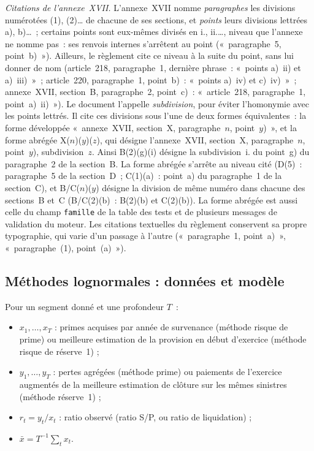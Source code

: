 \documentclass[a4paper,11pt]{article}
\newcommand{\code}[1]{\texttt{\small #1}}
\begin{document}
\smallskip
\emph{Citations de l'annexe~XVII.} L'annexe~XVII nomme \emph{paragraphes} les divisions
numérotées (1), (2)\dots{} de chacune de ses sections, et \emph{points} leurs divisions
lettrées a), b)\dots{}~; certains points sont eux-mêmes divisés en i., ii.\dots{}, niveau que
l'annexe ne nomme pas~: ses renvois internes s'arrêtent au point («~paragraphe~5,
point~b)~»). Ailleurs, le règlement cite ce niveau à la suite du point, sans lui donner de nom
(article~218, paragraphe~1, dernière phrase~: «~points a)~ii) et a)~iii)~»~; article~220,
paragraphe~1, point~b)~: «~points a)~iv) et c)~iv)~»~; annexe~XVII, section~B, paragraphe~2,
point~c)~: «~article~218, paragraphe~1, point~a)~ii)~»). Le document l'appelle
\emph{subdivision}, pour éviter l'homonymie avec les points lettrés. Il
cite ces divisions sous l'une de deux formes équivalentes~: la forme développée
«~annexe~XVII, section~X, paragraphe~$n$, point~$y$)~», et la forme abrégée X($n$)($y$)($z$), qui
désigne l'annexe~XVII, section~X, paragraphe~$n$, point~$y$), subdivision~$z$. Ainsi B(2)(g)(i)
désigne la subdivision~i. du point~g) du paragraphe~2 de la section~B. La forme abrégée s'arrête
au niveau cité (D(5)~: paragraphe~5 de la section~D~; C(1)(a)~: point~a) du paragraphe~1 de la
section~C), et B/C($n$)($y$) désigne la division de même numéro dans chacune des sections~B
et~C (B/C(2)(b)~: B(2)(b) et C(2)(b)). La forme abrégée est aussi celle du champ \code{famille}
de la table des tests et de plusieurs messages de validation du moteur. Les citations textuelles
du règlement conservent sa propre typographie, qui varie d'un passage à l'autre («~paragraphe~1,
point~a)~», «~paragraphe~(1), point~(a)~»).

\subsection*{Méthodes lognormales : données et modèle}

Pour un segment donné et une profondeur $T$~:
\begin{itemize}[itemsep=1pt]
  \item $x_1,\dots,x_T$ : primes acquises par année de survenance (méthode risque de prime) ou
        meilleure estimation de la provision en début d'exercice (méthode risque de réserve~1) ;
  \item $y_1,\dots,y_T$ : pertes agrégées (méthode prime) ou paiements de l'exercice augmentés de
        la meilleure estimation de clôture sur les mêmes sinistres (méthode réserve~1) ;
  \item $r_t = y_t / x_t$ : ratio observé (ratio S/P, ou ratio de liquidation) ;
  \item $\bar x = T^{-1}\sum_t x_t$.
\end{itemize}
\end{document}
